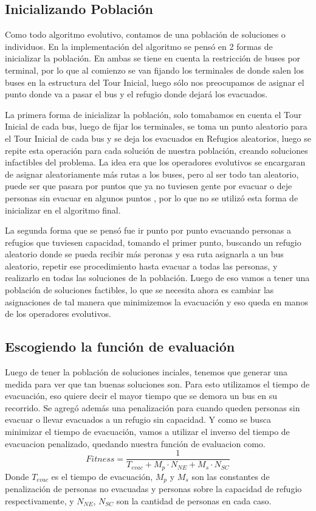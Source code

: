 \documentclass[letter, 10pt]{article}
\begin{document}
\subsection{Inicializando Población}
    Como todo algoritmo evolutivo, contamos de una población de soluciones o individuos. En la implementación del algoritmo se pensó en 2 formas de inicializar la población. En ambas se tiene en cuenta la restricción de buses por terminal, por lo que al comienzo se van fijando los terminales de donde salen los buses en la estructura del Tour Inicial, luego sólo nos preocupamos de asignar el punto donde va a pasar el bus y el refugio donde dejará los evacuados.
    
    La primera forma de inicializar la población, solo tomabamos en cuenta el Tour Inicial de cada bus, luego de fijar los terminales, se toma un punto aleatorio para el Tour Inicial de cada bus y se deja los evacuados en Refugios aleatorios, luego se repite esta operación para cada solución de nuestra población, creando soluciones infactibles del problema. La idea era que los operadores evolutivos se encargaran de asignar aleatoriamente más rutas a los buses, pero al ser todo tan aleatorio, puede ser que pasara por puntos que ya no tuviesen gente por evacuar o deje personas sin evacuar en algunos puntos , por lo que no se utilizó esta forma de inicializar en el algoritmo final.
    
    La segunda forma que se pensó fue ir punto por punto evacuando personas a refugios que tuviesen capacidad, tomando el primer punto, buscando un refugio aleatorio donde se pueda recibir más peronas y esa ruta asignarla a un bus aleatorio, repetir ese procedimiento hasta evacuar a todas las personas, y realizarlo en todas las soluciones de la población. Luego de eso vamos a tener una población de soluciones factibles, lo que se necesita ahora es cambiar las asignaciones de tal manera que minimizemos la evacuación y eso queda en manos de los operadores evolutivos.


\subsection{Escogiendo la función de evaluación}
    Luego de tener la población de soluciones inciales, tenemos que generar una medida para ver que tan buenas soluciones son. 
    Para esto utilizamos el tiempo de evacuación, eso quiere decir el mayor tiempo que se demora un bus en su recorrido. Se agregó además una penalización para cuando queden personas sin evacuar o llevar evacuados a un refugio sin capacidad. Y como se busca minimizar el tiempo de evacuación, vamos a utilizar el inverso del tiempo de evacuacion penalizado, quedando nuestra función de evaluacion como.
    \begin{equation*}
       Fitness =  \displaystyle\frac{1}{T_{evac} + M_p \cdot N_{NE} + M_s \cdot N_{SC}}
    \end{equation*}
Donde $T_{evac}$ es el tiempo de evacuación, $M_p$ y $M_s$ son las constantes de penalización de personas no evacuadas y personas sobre la capacidad de refugio respectivamente, y $N_{NE}$, $N_{SC}$ son la cantidad de personas en cada caso.
\end{document}
